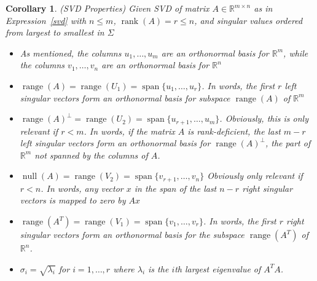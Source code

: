\documentclass[12pt]{article}
\numberwithin{equation}{section} %
\theoremstyle{plain}
\newtheorem{cor}[thm]{Corollary}
\theoremstyle{definition}
\theoremstyle{remark}
\newcommand{\Rn}{\mathbb{R}^n}
\newcommand{\Rm}{\mathbb{R}^m}
\newcommand{\Rmn}{\mathbb{R}^{m\times n}}
\newcommand{\nul}{\operatorname{null}}
\newcommand{\range}{\operatorname{range}}
\newcommand{\rank}{\operatorname{rank}}
\newcommand{\spann}{\operatorname{span}}
\begin{document}
\clearpage
\begin{cor}\emph{(SVD Properties)}
Given SVD of matrix $A\in\Rmn$ as in Expression~\ref{svd} with $n\leq
m$, $\rank(A)=r\leq n$, and singular values ordered from largest to
smallest in $\Sigma$
\begin{itemize}
  \item As mentioned, the columns $u_1,\ldots,u_m$ are an orthonormal
    basis for $\Rm$, while the columns $v_1,\ldots,v_n$ are an
    orthonormal basis for $\Rn$
  \item $\range(A)=\range(U_1)=\spann\{u_{1},\ldots,u_r\}$. In words,
    the first $r$ left singular vectors form an orthonormal basis for
    subspace $\range(A)$ of $\Rm$
  \item
    $\range(A)^\perp=\range(U_2)=\spann\{u_{r+1},\ldots,u_m\}$.
    Obviously, this is only relevant if $r<m$.
    In words, if the matrix $A$ is rank-deficient, the last $m-r$ left
    singular vectors form an orthonormal basis for $\range(A)^\perp$,
    the part of $\Rm$ \emph{not} spanned by the columns of $A$.
  \item $\nul(A)=\range(V_2)=\spann\{v_{r+1},\ldots,v_n\}$
    Obviously only relevant if $r<n$.
    In words, any vector $x$ in the span of the last $n-r$ right
    singular vectors is mapped to zero by $Ax$
  \item $\range(A^T)=\range(V_1)=\spann\{v_1,\ldots,v_r\}$.
    In words, the first $r$ right singular vectors form an orthonormal
    basis for the subspace $\range(A^T)$ of $\Rn$.
  \item $\sigma_i = \sqrt{\lambda_i}$ for $i=1,\ldots,r$ where
    $\lambda_i$ is the $i$th largest eigenvalue of $A^TA$.
\end{itemize}
\end{cor}
\end{document}
